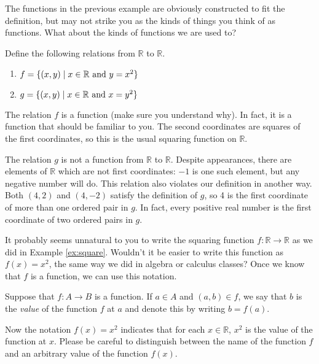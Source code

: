 The functions in the previous example are obviously constructed to fit the definition, but may not strike you as the kinds of things you think of as functions.  What about the kinds of functions we are used to?

\begin{example}\label{ex:square}
Define the following relations from $\mathbb R$ to $\mathbb R$.
\begin{enumerate}
\item $f=\{ (x,y)\mid x\in\mathbb R \hbox{ and } y=x^2\}$
\item $g=\{ (x,y)\mid x\in\mathbb R \hbox{ and } x=y^2\}$
\end{enumerate}
The relation $f$ is a function (make sure you understand why).  In fact, it is a function that should be familiar to you.  The second coordinates are squares of the first coordinates, so this is the usual squaring function on $\mathbb R$.

The relation $g$ is not a function from $\mathbb R$ to $\mathbb R$. Despite appearances, there are elements of $\mathbb R$ which are not first coordinates: $-1$ is one such element, but any negative number will do.  This relation also violates our definition in another way. Both $(4,2)$ and $(4,-2)$ satisfy the definition of $g$, so 4 is the first coordinate of more than one ordered pair in $g$.  In fact, every positive real number is the first coordinate of two ordered pairs in $g$.
\end{example}

It probably seems unnatural to you to write the squaring function $f:\mathbb R\to\mathbb R$ as we did in Example \ref{ex:square}. Wouldn't it be easier to write this function as $f(x)=x^2$, the same way we did in algebra or calculus classes?  Once we know that $f$ is a function, we can use this notation.

Suppose that $f:A\to B$ is a function.  If $a\in A$ and $(a,b)\in f$, we say that $b$ is the \emph{value} of the function $f$ at $a$ and denote this by writing $b=f(a)$.

Now the notation $f(x)=x^2$ indicates that for each $x\in\mathbb R$, $x^2$ is the value of the function at $x$.  Please be careful to distinguish between the name of the function $f$ and an arbitrary value of the function $f(x)$.

